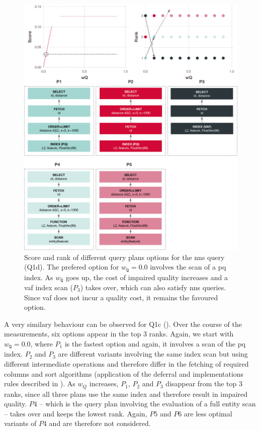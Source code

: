 \begin{figure}[p]
    \centering
    \includegraphics[width=\textwidth]{figures/analytics/analytics-cottontail-cost-nns-annotated}
    \caption{Score and rank of different query plans options for the \acrshort{nns} query (Q1d). The prefered option for $w_{\texttt{Q}} = 0.0$ involves the scan of a \acrshort{pq} index. As $w_{\texttt{Q}}$ goes up, the cost of impaired quality increases and a \acrshort{vaf} index scan ($P_3$) takes over, which can also satisfy \acrshort{nns} queries. Since \acrshort{vaf} does not incur a quality cost, it remains the favoured option.}
    \label{figure:cottontail_analytics_cost_nns}
\end{figure}

A very similary behaviour can be observed for Q1c (). Over the course of the measurements, six options appear in the top $3$ ranks. Again, we start with  $w_{\mathtt{Q}} = 0.0$, where $P_1$ is the fastest option and again, it involves a scan of the \acrshort{pq} index. $P_2$ and $P_3$ are different variants involving the same index scan but using different intermediate operations and therefore differ in the fetching of required columns and sort algorithms (application of the deferral and implementations rules described in ). As $w_Q$ increases, $P_1$, $P_2$ and $P_3$ disappear from the top $3$ ranks, since all three plans use the same index and therefore result in impaired quality. $P4$ -- which is the query plan involving the evaluation of a full entity scan -- takes over and keeps the lowest rank. Again, $P5$ and $P6$ are less optimal variants of $P4$ and are therefore not considered.

